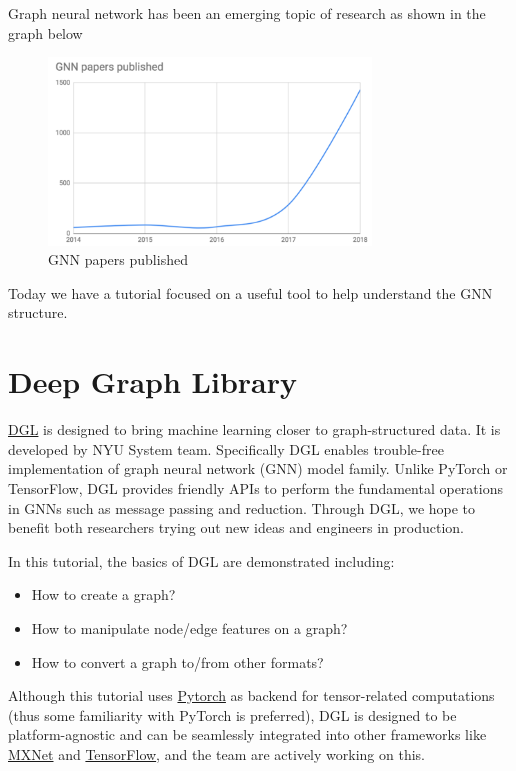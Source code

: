 Graph neural network has been an emerging topic of research as shown in the graph below

\begin{figure}[ht]
\begin{center}
  \includegraphics[width=3.38in]{labs/14/images/GNN Papers Published.png}
\end{center}
   \caption{GNN papers published}
\label{fig:CV}
\end{figure}

Today we have a tutorial focused on a useful tool to help understand the GNN structure.

\section{Deep Graph Library}
\href{www.dgl.ai}{DGL} is designed to bring machine learning closer to graph-structured data. It is developed by NYU System team. Specifically DGL enables trouble-free implementation of graph neural network (GNN) model family. Unlike PyTorch or TensorFlow, DGL provides friendly APIs to perform the fundamental operations in GNNs such as message passing and reduction. Through DGL, we hope to benefit both researchers trying out new ideas and engineers in production.

In this tutorial, the basics of DGL are demonstrated including:
\begin{itemize}
\item How to create a graph?
\item How to manipulate node/edge features on a graph?
\item How to convert a graph to/from other formats?
\end{itemize}

Although this tutorial uses \href{https://pytorch.org}{Pytorch} as backend for tensor-related computations (thus some familiarity with PyTorch is preferred), DGL is designed to be platform-agnostic and can be seamlessly integrated into other frameworks like \href{https://mxnet.apache.org/}{MXNet} and \href{https://www.tensorflow.org/}{TensorFlow}, and the team are actively working on this.

